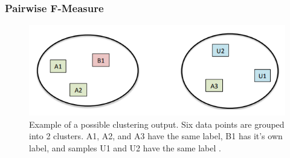 \documentclass[12pt,english]{article}
\begin{document}
\subsubsection{Pairwise F-Measure}

\begin{figure}[!tbp]
 \centering
    \includegraphics[width=\columnwidth]{figures/fmeasure.png}
    \caption{Example of a possible clustering output. Six data points are grouped into 2 clusters. A1, A2, and A3 have the same label, B1 has it's own label, and samples U1 and U2 have the same label \cite{otto}.}
    \label{fig:fmeasure}
\end{figure}
\end{document}
